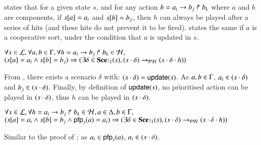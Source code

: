 states that for a given state $s$, and for any action $h = a_i\rightarrow b_j\Rsh b_k$ where $a$ and $b$ are components,
if ${s[a]} = a_i$ and ${s[b]} = b_j$, then
$h$ can always be played after a series of hits (and these hits do not prevent it to be fired).
 states the same if $a$ is a cooperative sort, under the condition that $a$ is updated in $s$.
\begin{theorem}
\label{th:hcompcomp}
  $\forall s \in \mathcal{L}, \forall a,b \in \Gamma, \forall h = a_i\rightarrow b_j\Rsh b_k \in \mathcal{H},$\\
  $(\PHget{s}{a} = a_i \wedge \PHget{s}{b} = b_j) \Rightarrow (\exists \delta \in \restriction{\Sce}{1}(s),
  (s \PHplay \delta) \PHPtrans (s \PHplay \delta \PHplay h))$
\end{theorem}
%
\begin{proofhcompcomp}
  From , there exists a scenario $\delta$ with: $(s \cdot \delta) = \mathsf{update}(s)$.
  As $a,b \in \Gamma$, $a_i \in (s \cdot \delta)$ and $b_j \in (s \cdot \delta)$.
  Finally, by definition of $\mathsf{update}(s)$, no prioritised action can be played in $(s \cdot \delta)$, thus $h$ can be played in $(s \cdot \delta)$.
\end{proofhcompcomp}
%
\begin{theorem}
\label{th:hcscomp}
  $\forall s \in \mathcal{L}, \forall h = a_i\rightarrow b_j\Rsh b_k \in \mathcal{H}, a \in \Delta, b \in \Gamma,$\\
  $(\PHget{s}{a} = a_i \wedge \PHget{s}{b} = b_j \wedge \pfp_s(a) = a_i) \Rightarrow (\exists \delta \in \restriction{\Sce}{1}(s),
  (s \PHplay \delta) \PHPtrans (s \PHplay \delta \PHplay h))$
\end{theorem}
%
\begin{proofhcscomp}
  Similar to the proof of ;
  as $a_i \in \mathsf{pfp}_s(a)$, $a_i \in (s \cdot \delta)$.
\end{proofhcscomp}
